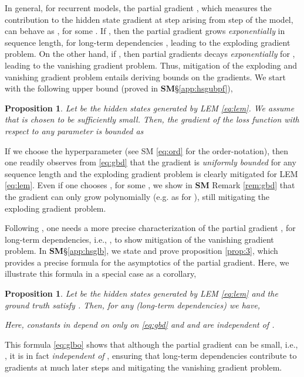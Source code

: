 \documentclass{article} \usepackage{iclr2022_conference,times}
\newtheorem{proposition}[theorem]{Proposition}
\begin{document}
In general, for recurrent models, the partial gradient , which measures the contribution to the hidden state gradient at step  arising from step  of the model, can behave as , for some  \cite{vanish_grad}. If , then the partial gradient grows \emph{exponentially} in sequence length, for long-term dependencies , leading to the exploding gradient problem. On the other hand, if , then partial gradients decays \emph{exponentially} for , leading to the vanishing gradient problem. Thus, mitigation of the exploding and vanishing gradient problem entails deriving bounds on the gradients. We start with the following upper bound (proved in {\bf SM}\S\ref{app:hsgubpf}), 
\begin{proposition}
\label{prop:2}
Let  be the hidden states generated by LEM \eqref{eq:lem}. We assume that  is chosen to be sufficiently small. Then, the gradient of the loss function  with respect to any parameter  is bounded as 

\end{proposition}
If we choose the hyperparameter  (see SM \eqref{eq:ord} for the order-notation), then one readily observes from \eqref{eq:gbd} that the gradient  is \emph{uniformly bounded} for any sequence length  and the exploding gradient problem is clearly mitigated for LEM \eqref{eq:lem}. Even if one chooses , for some , we show in {\bf SM} Remark \ref{rem:gbd} that the gradient can only grow polynomially (e.g. as  for ), still mitigating the exploding gradient problem.

Following \cite{vanish_grad}, one needs a more precise characterization of the partial gradient 
, for long-term dependencies, i.e., , to show mitigation of the vanishing gradient problem. In {\bf SM}\S\ref{app:hsglb}, we state and prove proposition \ref{prop:3}, which provides a precise formula for the asymptotics of the partial gradient. Here, we illustrate this formula in a special case as a corollary,
\begin{proposition}
\label{prop:3cor}
Let  be the hidden states generated by LEM \eqref{eq:lem} and the ground truth satisfy .
Then, for any  (long-term dependencies) we have,

Here, constants in  depend on only on  \eqref{eq:gbd} and  and are independent of .
\end{proposition}
This formula \eqref{eq:glbo} shows that although the partial gradient can be small, i.e.,
, it is in fact \emph{independent of }, ensuring that long-term dependencies contribute to gradients at much later steps and mitigating the vanishing gradient problem.
\end{document}
